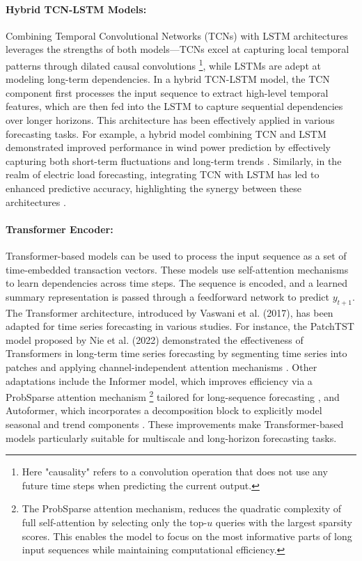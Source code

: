 \documentclass{article}
\begin{document}
\paragraph{Hybrid TCN-LSTM Models:} Combining Temporal Convolutional Networks (TCNs) with LSTM architectures leverages the strengths of both models—TCNs excel at capturing local temporal patterns through dilated causal convolutions \footnote{Here "causality" refers to a convolution operation that does not use any future time steps when predicting the current output.}, while LSTMs are adept at modeling long-term dependencies. In a hybrid TCN-LSTM model, the TCN component first processes the input sequence to extract high-level temporal features, which are then fed into the LSTM to capture sequential dependencies over longer horizons. This architecture has been effectively applied in various forecasting tasks. For example, a hybrid model combining TCN and LSTM demonstrated improved performance in wind power prediction by effectively capturing both short-term fluctuations and long-term trends \cite{wang2024hybrid}. Similarly, in the realm of electric load forecasting, integrating TCN with LSTM has led to enhanced predictive accuracy, highlighting the synergy between these architectures \cite{rao2024hybrid}.




\paragraph{Transformer Encoder:} Transformer-based models can be used to process the input sequence as a set of time-embedded transaction vectors. These models use self-attention mechanisms to learn dependencies across time steps. The sequence is encoded, and a learned summary representation is passed through a feedforward network to predict \( y_{t+1} \). The Transformer architecture, introduced by Vaswani et al. (2017), has been adapted for time series forecasting in various studies. For instance, the PatchTST model proposed by Nie et al. (2022) demonstrated the effectiveness of Transformers in long-term time series forecasting by segmenting time series into patches and applying channel-independent attention mechanisms \cite{nie2022time}. Other adaptations include the Informer model, which improves efficiency via a ProbSparse attention mechanism \footnote{The ProbSparse attention mechanism, reduces the quadratic complexity of full self-attention by selecting only the top-\( u \) queries with the largest sparsity scores. This enables the model to focus on the most informative parts of long input sequences while maintaining computational efficiency.}
tailored for long-sequence forecasting \cite{zhou2021informer}, and Autoformer, which incorporates a decomposition block to explicitly model seasonal and trend components \cite{wu2021autoformer}. These improvements make Transformer-based models particularly suitable for multiscale and long-horizon forecasting tasks.
\end{document}
